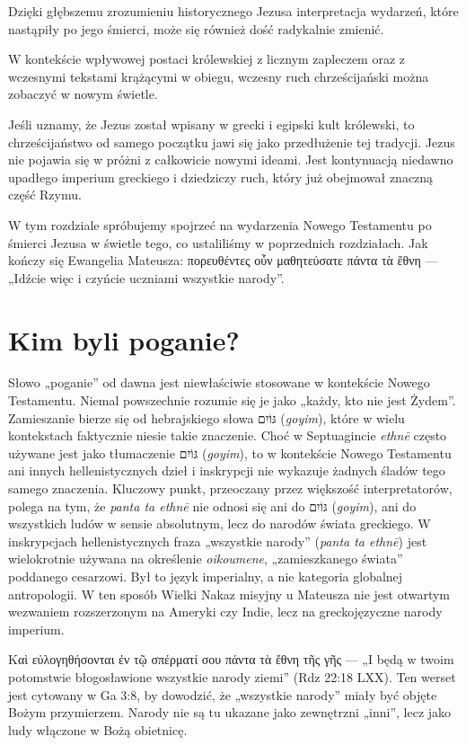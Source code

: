 Dzięki głębszemu zrozumieniu historycznego Jezusa interpretacja wydarzeń, które nastąpiły po jego śmierci, może się również dość radykalnie zmienić.

W kontekście wpływowej postaci królewskiej z licznym zapleczem oraz z wczesnymi tekstami krążącymi w obiegu, wczesny ruch chrześcijański można zobaczyć w nowym świetle.

Jeśli uznamy, że Jezus został wpisany w grecki i egipski kult królewski, to chrześcijaństwo od samego początku jawi się jako przedłużenie tej tradycji.
Jezus nie pojawia się w próżni z całkowicie nowymi ideami.
Jest kontynuacją niedawno upadłego imperium greckiego i dziedziczy ruch, który już obejmował znaczną część Rzymu.

W tym rozdziale spróbujemy spojrzeć na wydarzenia Nowego Testamentu po śmierci Jezusa w świetle tego, co ustaliliśmy w poprzednich rozdziałach.
Jak kończy się Ewangelia Mateusza: πορευθέντες οὖν μαθητεύσατε πάντα τὰ ἔθνη --- „Idźcie więc i czyńcie uczniami wszystkie narody”.

\section{Kim byli poganie?}\label{sec:who-were-the-gentiles}

Słowo „poganie” od dawna jest niewłaściwie stosowane w kontekście Nowego Testamentu.
Niemal powszechnie rozumie się je jako „każdy, kto nie jest Żydem”.
Zamieszanie bierze się od hebrajskiego słowa \texthebrew{גּוֹיִם} (\textit{goyim}), które w wielu kontekstach faktycznie niesie takie znaczenie.
Choć w Septuagincie \textit{ethnē} często używane jest jako tłumaczenie \texthebrew{גּוֹיִם} (\textit{goyim}), to w kontekście Nowego Testamentu ani innych hellenistycznych dzieł i inskrypcji nie wykazuje żadnych śladów tego samego znaczenia.
Kluczowy punkt, przeoczany przez większość interpretatorów, polega na tym, że \textit{panta ta ethnē} nie odnosi się ani do \texthebrew{גּוֹיִם} (\textit{goyim}), ani do wszystkich ludów w sensie absolutnym, lecz do narodów świata greckiego.
W inskrypcjach hellenistycznych fraza „wszystkie narody” (\textit{panta ta ethnē}) jest wielokrotnie używana na określenie \textit{oikoumene}, „zamieszkanego świata” poddanego cesarzowi.
Był to język imperialny, a nie kategoria globalnej antropologii.
W ten sposób Wielki Nakaz misyjny u Mateusza nie jest otwartym wezwaniem rozszerzonym na Ameryki czy Indie, lecz na greckojęzyczne narody imperium.

Καὶ εὐλογηθήσονται ἐν τῷ σπέρματί σου πάντα τὰ ἔθνη τῆς γῆς --- „I będą w twoim potomstwie błogosławione wszystkie narody ziemi” (Rdz 22:18 LXX).
Ten werset jest cytowany w Ga 3:8, by dowodzić, że „wszystkie narody” miały być objęte Bożym przymierzem.
Narody nie są tu ukazane jako zewnętrzni „inni”, lecz jako ludy włączone w Bożą obietnicę.

